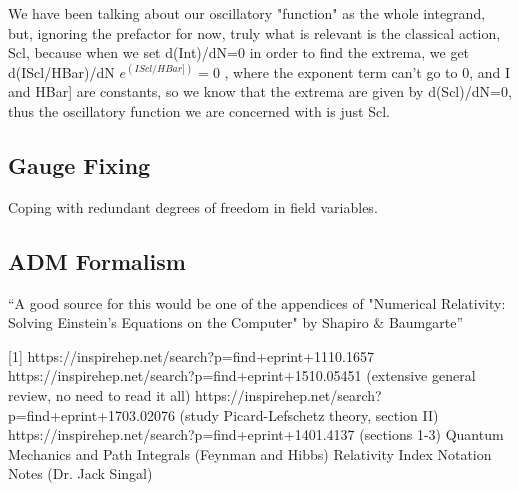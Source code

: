 \documentclass[12pt]{revtex4}
\begin{document}
We have been talking about our oscillatory "function" as the whole integrand, but, ignoring the prefactor for now, truly what is relevant is the classical action, Scl, because when we set d(Int)/dN=0 in order to find the extrema, we get d(IScl/HBar)/dN $e^(IScl/HBar])=0$ , where the exponent term can't go to 0, and I and HBar] are constants, so we know that the extrema are given by d(Scl)/dN=0, thus the oscillatory function we are concerned with is just Scl.

\subsection{Gauge Fixing} \label{gauge}
Coping with redundant degrees of freedom in field variables.

\subsection{ADM Formalism} \label{ADM}
``A good source for this would be one of the appendices of "Numerical Relativity: Solving Einstein's Equations on the Computer" by Shapiro \& Baumgarte''

\begin{thebibliography}{}

[1] https://inspirehep.net/search?p=find+eprint+1110.1657 \newline
[2] https://inspirehep.net/search?p=find+eprint+1510.05451  (extensive general review, no need to read it all) \newline
[3] https://inspirehep.net/search?p=find+eprint+1703.02076   (study Picard-Lefschetz theory, section II) \newline
[4] https://inspirehep.net/search?p=find+eprint+1401.4137   (sections 1-3) \newline
[5] Quantum Mechanics and Path Integrals (Feynman and Hibbs) \newline
[6] Relativity Index Notation Notes (Dr. Jack Singal) \newline
[7] \newline
[8] \newline
\end{thebibliography}
\end{document}
